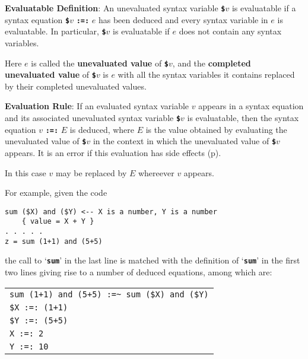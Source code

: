 \documentclass[12pt]{article}
\newcommand{\TT}[1]{{\tt \bfseries #1}}
\newcommand{\key}[1]{{\rm \bfseries #1}}
\newcommand{\pagref}[1]{p\pageref{#1}}
\newenvironment{indpar}[1][0.3in]%
	{\begin{list}{}%
		     {\setlength{\itemsep}{0in}%
		      \setlength{\topsep}{0in}%
		      \setlength{\parsep}{1ex}%
		      \setlength{\labelwidth}{#1}%
		      \setlength{\leftmargin}{#1}%
		      \addtolength{\leftmargin}{\labelsep}}%
	 \item}%
	{\end{list}}
\begin{document}
\begin{indpar}
\begin{list}{}{}
\item [\key{Evaluatable Definition}:]%
\label{EVALUATABLE-DEFINITION}
An unevaluated
syntax variable \TT{\$}$v$ is evaluatable if a syntax equation
\TT{\$}$v$ \TT{:=:} $e$
has been deduced and every syntax variable in $e$ is evaluatable.
In particular, \TT{\$}$v$ is evaluatable if $e$ does not contain any syntax
variables.

Here $e$ is called the \key{unevaluated value} of \TT{\$}$v$, and
the \key{completed unevaluated value} of \TT{\$}$v$ is $e$ with all the
syntax variables it contains replaced by their completed unevaluated values.

\item [\key{Evaluation Rule}:]%
\label{EVALUATION-RULE}
If an evaluated syntax variable $v$ appears in a syntax equation and
its associated unevaluated syntax variable \TT{\$}$v$ is evaluatable,
then the syntax equation $v$ \TT{:=:} $E$ is deduced, where $E$
is the value obtained by evaluating the unevaluated value of
\TT{\$}$v$ in the context
in which the unevaluated value of \TT{\$}$v$ appears.
It is an error if this evaluation has side effects (\pagref{SIDE-EFFECTS}).

In this case $v$ may be replaced by $E$ whereever $v$ appears.
\end{list}
\end{indpar}

For example, given the code

\begin{indpar}\begin{verbatim}
sum ($X) and ($Y) <-- X is a number, Y is a number
    { value = X + Y }
. . . . .
z = sum (1+1) and (5+5)
\end{verbatim}\end{indpar}

the call to `\TT{sum}' in the last line is matched with the definition
of `\TT{sum}' in the first two lines giving rise to a number of deduced
equations, among which are:

\begin{center}
\begin{tabular}{l}
\verb/sum (1+1) and (5+5) :=~ sum ($X) and ($Y)/ \\
\verb/$X :=: (1+1)/ \\
\verb/$Y :=: (5+5)/ \\
\verb/X :=: 2/ \\
\verb/Y :=: 10/ \\
\end{tabular}
\end{center}
\end{document}
